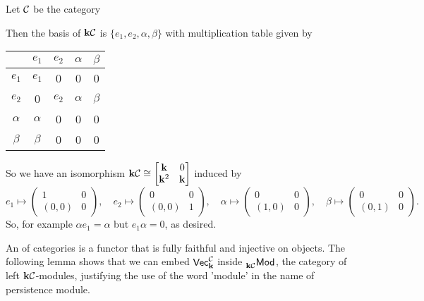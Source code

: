 \begin{example}\label{example:pathAlgebra}
    Let $\mathcal{C}$ be the category
    \begin{center}
    \end{center}
    Then the basis of $\mathbf{k}\mathcal{C}$ is $\{e_1, e_2,\alpha,\beta\}$ with multiplication table given by
    \begin{center}
        \begin{tabular}{c|cccc}
            &$e_1$&$e_2$&$\alpha$&$\beta$\\
            \hline
            $e_1$&$e_1$&0&0&0\\
            $e_2$&0&$e_2$&$\alpha$&$\beta$\\
            $\alpha$&$\alpha$&0&0&0\\
            $\beta$&$\beta$&0&0&0
        \end{tabular}
    \end{center}
    So we have an isomorphism $\mathbf{k}\mathcal{C}\cong\begin{bmatrix}\mathbf{k}&0\\\mathbf{k}^2&\mathbf{k}\end{bmatrix}$ induced by
    \[ e_1\mapsto\begin{pmatrix}1&0\\(0,0)&0\end{pmatrix},\quad e_2\mapsto\begin{pmatrix}0&0\\(0,0)&1\end{pmatrix},\quad\alpha\mapsto\begin{pmatrix}0&0\\(1,0)&0\end{pmatrix},\quad \beta\mapsto\begin{pmatrix}0&0\\(0,1)&0\end{pmatrix}. \]
    So, for example $\alpha e_1=\alpha$ but $e_1\alpha=0$, as desired.
\end{example}
An  of categories is a functor that is fully faithful and injective on objects.
The following lemma shows that we can embed $\normalfont\mathsf{Vec}_{\mathbf{k}}^{\mathcal{C}}$ inside $\prescript{}{\mathbf{k}\mathcal{C}}{\normalfont\mathsf{Mod}}_{}$, the category of left $\mathbf{k}\mathcal{C}$-modules, justifying the use of the word 'module' in the name of persistence module.

